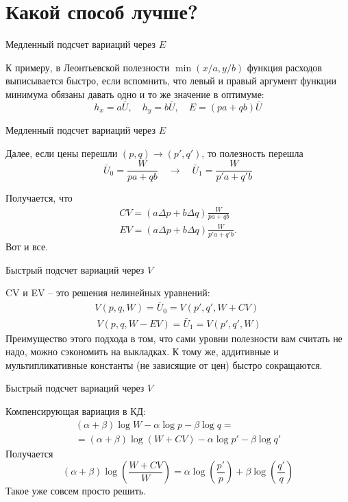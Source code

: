 \documentclass{beamer}
\begin{document}
\section{Какой способ лучше?}

\begin{frame}{Медленный подсчет вариаций через $E$}

К примеру, в Леонтьевской полезности $\min(x/a,y/b)$ функция расходов выписывается быстро, если вспомнить, что левый и правый аргумент функции минимума обязаны давать одно и то же значение в оптимуме: 
$$h_x = a \bar U, \quad h_y = b \bar U, \quad E = (pa + qb) \bar U$$
\end{frame}

\begin{frame}{Медленный подсчет вариаций через $E$}

Далее, если цены перешли $(p,q) \to (p',q')$, то полезность перешла 
$$ \bar U_0 = \frac{W}{pa + qb} \quad \to \quad \bar U_1 = \frac{W}{p'a + q'b} $$

Получается, что
\begin{gather*}
CV = (a \Delta p + b \Delta q) \frac{W}{pa + qb}\\
EV = (a \Delta p + b \Delta q) \frac{W}{p' a + q' b}.
\end{gather*}
Вот и все.
\end{frame}

\begin{frame}{Быстрый подсчет вариаций через $V$}

CV и EV  – это решения нелинейных уравнений:
\begin{gather*}
V(p,q,W) = \bar U_0 = V(p',q',W+CV)\\\
V(p,q,W-EV) = \bar U_1 = V(p',q',W)
\end{gather*}
Преимущество этого подхода в том, что сами уровни полезности вам считать не надо, можно сэкономить на выкладках. К тому же, аддитивные и мультипликативные константы (не зависящие от цен) быстро сокращаются.

\end{frame}

\begin{frame}{Быстрый подсчет вариаций через $V$}

Компенсирующая вариация в КД:
\begin{gather*}
 (\alpha + \beta)\log W - \alpha \log p - \beta \log q = \\
 = (\alpha + \beta)\log (W+CV) - \alpha \log p' - \beta \log q'
\end{gather*}
Получается
$$(\alpha + \beta)\log(\frac{W+CV}{W}) = \alpha \log (\frac{p'}{p}) + \beta \log (\frac{q'}{q})$$
Такое уже совсем просто решить.
\end{frame}
\end{document}
